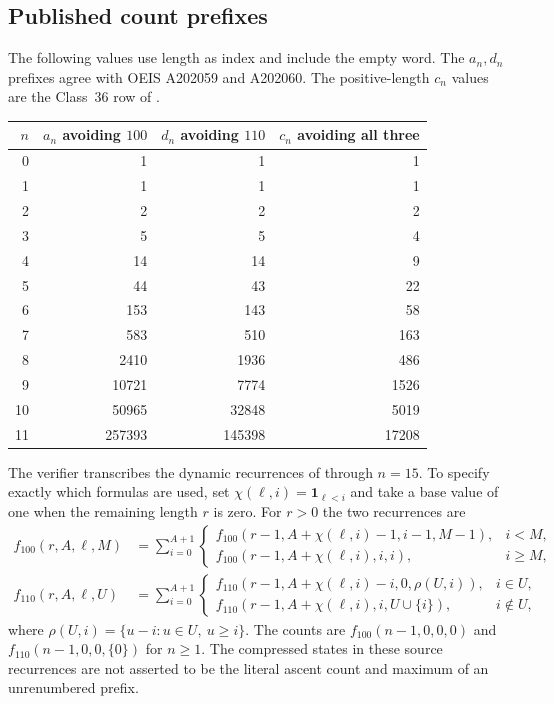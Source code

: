 \documentclass[11pt,letterpaper]{article}
\theoremstyle{remark}\newtheorem{remark}[theorem]{Remark}
\theoremstyle{remark}\newtheorem{wremark}{Remark}\renewcommand{\thewremark}{W\arabic{wremark}}
\theoremstyle{plain}\newtheorem{wcorollary}[wremark]{Corollary}
\begin{document}
\subsection{Published count prefixes}
The following values use length as index and include the empty word. The $a_n,d_n$ prefixes agree with OEIS A202059 and A202060. The positive-length $c_n$ values are the Class~36 row of \cite[Table~2]{callan}.
\begin{center}
\begin{tabular}{r r r r}
\toprule
$n$ & $a_n$ avoiding $100$ & $d_n$ avoiding $110$ & $c_n$ avoiding all three\\
\midrule
0&1&1&1\\
1&1&1&1\\
2&2&2&2\\
3&5&5&4\\
4&14&14&9\\
5&44&43&22\\
6&153&143&58\\
7&583&510&163\\
8&2410&1936&486\\
9&10721&7774&1526\\
10&50965&32848&5019\\
11&257393&145398&17208\\
\bottomrule
\end{tabular}
\end{center}

The verifier transcribes the dynamic recurrences of \cite[\S\S2.3--2.4]{conway} through $n=15$. To specify exactly which formulas are used, set $\chi(\ell,i)=\mathbf1_{\ell<i}$ and take a base value of one when the remaining length $r$ is zero. For $r>0$ the two recurrences are
\begin{align}
 f_{100}(r,A,\ell,M)
 &=\sum_{i=0}^{A+1}
 \begin{cases}
 f_{100}(r-1,A+\chi(\ell,i)-1,i-1,M-1),&i<M,\\
 f_{100}(r-1,A+\chi(\ell,i),i,i),&i\geq M,
 \end{cases}\label{a59:g:eq:rec100}\\
 f_{110}(r,A,\ell,U)
 &=\sum_{i=0}^{A+1}
 \begin{cases}
 f_{110}(r-1,A+\chi(\ell,i)-i,0,\rho(U,i)),&i\in U,\\
 f_{110}(r-1,A+\chi(\ell,i),i,U\cup\{i\}),&i\notin U,
 \end{cases}\label{a59:g:eq:rec110}
\end{align}
where $\rho(U,i)=\{u-i:u\in U,\ u\geq i\}$. The counts are
$f_{100}(n-1,0,0,0)$ and $f_{110}(n-1,0,0,\{0\})$ for $n\geq1$. The compressed states in these source recurrences are not asserted to be the literal ascent count and maximum of an unrenumbered prefix.
\end{document}
